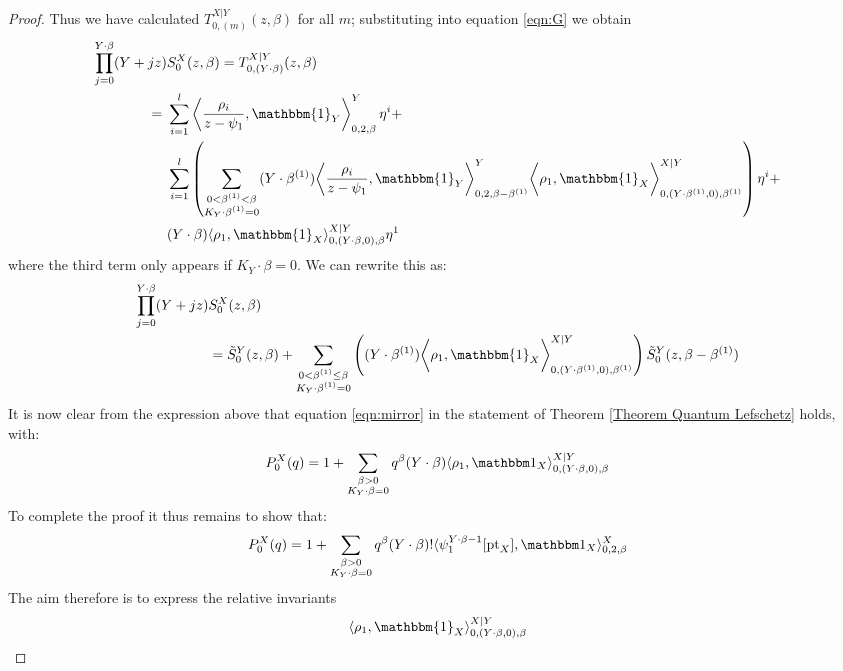 \begin{proof}
Thus we have calculated $T_{0,(m)}^{X|Y}(z,\beta)$ for all $m$; substituting into equation \eqref{eqn:G} we obtain
\begin{align*} \prod_{j=0}^{Y \cdot \beta} (Y + jz) & S_0^X(z,\beta) = T_{0,(Y\cdot\beta)}^{X|Y}(z,\beta) \\
= \ & \sum_{i=1}^l \left\langle \dfrac{\rho_i}{z-\psi_1}, \mathbbm{1}_Y \right\rangle_{0,2,\beta}^Y \eta^i + \\
& \sum_{i=1}^l \left( \sum_{\substack{0 < \beta^{(1)} < \beta \\ K_Y \cdot \beta^{(1)}=0}} (Y \cdot \beta^{(1)}) \bigg\langle \dfrac{\rho_i}{z-\psi_1}, \mathbbm{1}_Y \bigg\rangle_{0,2,\beta-\beta^{(1)}}^Y \bigg\langle \rho_1, \mathbbm{1}_X \bigg\rangle_{0,(Y \cdot \beta^{(1)},0),\beta^{(1)}}^{X|Y} \right) \eta^i + \\
& (Y \cdot \beta) \langle \rho_1 , \mathbbm{1}_X \rangle_{0,(Y \cdot \beta,0),\beta}^{X|Y} \eta^1
\end{align*}
where the third term only appears if $K_Y \cdot \beta=0$. We can rewrite this as:
\begin{align*} \prod_{j=0}^{Y \cdot \beta} (Y + jz) & S_0^X(z,\beta) \\
& = \tilde{S}_0^Y(z,\beta) + \sum_{\substack{0 < \beta^{(1)} \leq \beta \\ K_Y \cdot \beta^{(1)}=0}} \left( (Y \cdot \beta^{(1)}) \bigg\langle \rho_1, \mathbbm{1}_X \bigg\rangle_{0,(Y \cdot \beta^{(1)},0),\beta^{(1)}}^{X|Y} \right) \tilde{S}_0^Y(z,\beta-\beta^{(1)})
\end{align*}
It is now clear from the expression above that equation \eqref{eqn:mirror} in the statement of Theorem \ref{Theorem Quantum Lefschetz} holds, with:
\begin{equation*} P_0^X(q) = 1 + \sum_{\substack{\beta>0 \\ K_Y\cdot\beta=0}} q^\beta (Y\cdot\beta) \langle \rho_1,\mathbbm 1_{X}\rangle_{0,(Y\cdot\beta,0),\beta}^{X|Y} \end{equation*}
To complete the proof it thus remains to show that:
\begin{equation*} P_0^X(q) = 1 + \sum_{\substack{\beta>0 \\ K_Y\cdot\beta=0}} q^\beta(Y\cdot\beta)!\langle\psi_1^{Y\cdot\beta-1} [\pt_X],\mathbbm 1_{X}\rangle_{0,2,\beta}^X \end{equation*}
The aim therefore is to express the relative invariants
\begin{equation*} \langle \rho_1 , \mathbbm{1}_X \rangle_{0,(Y\cdot\beta,0),\beta}^{X|Y} \end{equation*}

\end{proof}
